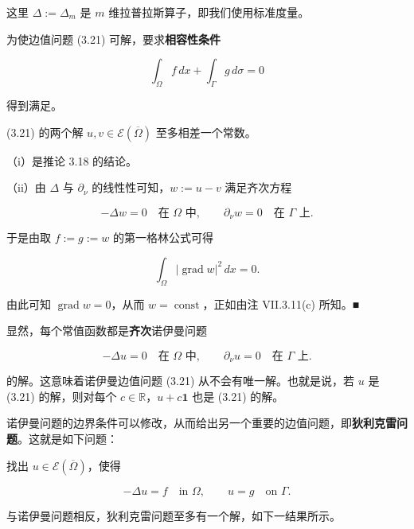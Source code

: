 这里 $ \Delta := \Delta_m $ 是 $ m $ 维拉普拉斯算子，即我们使用标准度量。

\begin{proposition}

\begin{subitems}
\item

为使边值问题 (3.21) 可解，要求\textbf{相容性条件}

\[
\int_\Omega f\, dx + \int_\Gamma g\, d\sigma = 0
\]

得到满足。

\item

(3.21) 的两个解 $ u, v \in \mathcal{E}(\overline{\Omega}) $ 至多相差一个常数。

\proofhead
（i）是推论 3.18 的结论。
\end{subitems}

（ii）由 $ \Delta $ 与 $ \partial_\nu $ 的线性性可知，$ w := u - v $ 满足齐次方程

\[
-\Delta w = 0 \quad \text{在 } \Omega \text{ 中}, \qquad \partial_\nu w = 0 \quad \text{在 } \Gamma \text{ 上}.
\]

于是由取 $ f := g := w $ 的第一格林公式可得

\[
\int_\Omega |\operatorname{grad} w|^2\, dx = 0.
\]

由此可知 $ \operatorname{grad} w = 0 $，从而 $ w = \operatorname{const} $，正如由注 VII.3.11(c) 所知。\nobreak\hspace{0.35em}■

\end{proposition}

显然，每个常值函数都是\textbf{齐次}诺伊曼问题

\[
-\Delta u = 0 \quad \text{在 } \Omega \text{ 中}, \qquad \partial_\nu u = 0 \quad \text{在 } \Gamma \text{ 上}.
\]

的解。这意味着诺伊曼边值问题 (3.21) 从不会有唯一解。也就是说，若 $ u $ 是 (3.21) 的解，则对每个 $ c \in \mathbb{R} $，$ u + c\mathbf{1} $ 也是 (3.21) 的解。

诺伊曼问题的边界条件可以修改，从而给出另一个重要的边值问题，即\textbf{狄利克雷问题}。这就是如下问题：

找出 $ u \in \mathcal{E}(\overline{\Omega}) $，使得

\[
-\Delta u = f \quad \text{in } \Omega, \qquad u = g \quad \text{on } \Gamma .
\]

与诺伊曼问题相反，狄利克雷问题至多有一个解，如下一结果所示。

